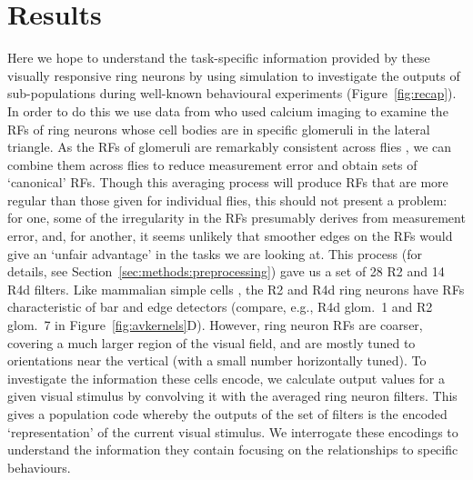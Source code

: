 \documentclass[10pt]{article}
\begin{document}
\section*{Results}
Here we hope to understand the task-specific information provided by these visually responsive ring neurons by using simulation to investigate the outputs of sub-populations during well-known behavioural experiments (Figure~\ref{fig:recap}). In order to do this we use data from \cite{Seelig2013} who used calcium imaging to examine the \acp{RF} of ring neurons whose cell bodies are in specific glomeruli in the lateral triangle. As the RFs of glomeruli are remarkably consistent across flies \cite{Seelig2013}, we can combine them across flies to reduce measurement error and obtain sets of `canonical' RFs. Though this averaging process will produce \acp{RF} that are more regular than those given for individual flies, this should not present a problem: for one, some of the irregularity in the \acp{RF} presumably derives from measurement error, and, for another, it seems unlikely that smoother edges on the \acp{RF} would give an `unfair advantage' in the tasks we are looking at. This process (for details, see Section~\ref{sec:methods:preprocessing}) gave us a set of 28 R2 and 14 R4d filters. Like mammalian simple cells \cite{Hubel1962,Wystrach2014}, the R2 and R4d ring neurons have RFs characteristic of bar and edge detectors (compare, e.g., R4d glom.~1 and R2 glom.~7 in Figure~\ref{fig:avkernels}D).
However, ring neuron RFs are coarser, covering a much larger region of the visual field, and are mostly tuned to orientations near the vertical (with a small number horizontally tuned). To investigate the information these cells encode, we calculate output values for a given visual stimulus by convolving it with the averaged ring neuron filters. This gives a population code whereby the outputs of the set of filters is the encoded `representation' of the current visual stimulus. We interrogate these encodings to understand the information they contain focusing on the relationships to specific behaviours.
\end{document}
